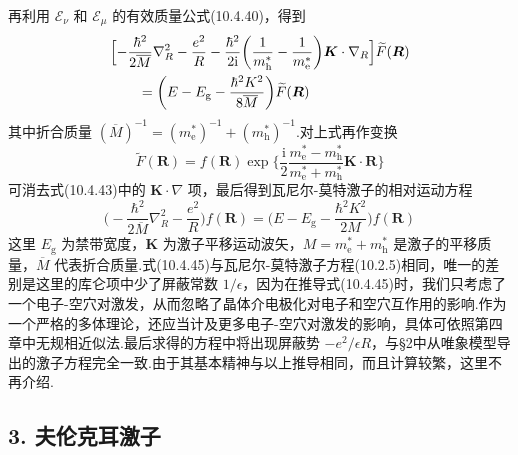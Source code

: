再利用 $\mathscr{E}_{\nu}$ 和 $\mathscr{E}_{\mu}$ 的有效质量公式(10.4.40)，得到
\begin{equation}
\begin{aligned}
  &\Bigl[-\frac{\hbar^{2}}{2\overline{M}}\nabla_{R}^{2}
  -\frac{e^{2}}{R}
  -\frac{\hbar^{2}}{2\mathrm{i}}\biggl(\frac{1}{m_{\mathrm{h}}^{*}}
  -\frac{1}{m_{\mathrm{e}}^{*}}\biggr)\boldsymbol{K}\cdot\nabla_{R}\Bigr]\widetilde{F}(\boldsymbol{R})\\
  &\qquad=\biggl(E-E_{\mathrm{g}}-\frac{\hbar^{2}K^{2}}{8\overline{M}}\biggr)\widetilde{F}(\boldsymbol{R})
\end{aligned}
\end{equation}
其中折合质量 $\left(\overline{M}\right)^{-1}
=\left(m_{\mathrm{e}}^{*}\right)^{-1}
+\left(m_{\mathrm{h}}^{*}\right)^{-1}$.对上式再作变换
\begin{equation}
  \widetilde{F}(\boldsymbol{R})=f(\boldsymbol{R})\exp
  \biggl\{\frac{\mathrm{i}}{2}\frac{m_{\mathrm{e}}^{*}-m_{\mathrm{h}}^{*}}
  {m_{\mathrm{e}}^{*}+m_{\mathrm{h}}^{*}}\boldsymbol{K}\cdot\boldsymbol{R}\biggr\}
\end{equation}
可消去式(10.4.43)中的 $\boldsymbol{K}\cdot\nabla$ 项，最后得到瓦尼尔-莫特激子的相对运动方程
\begin{equation}
  \Biggl(-\frac{\hbar^{2}}{2\overline{M}}\nabla_{R}^{2}
  -\frac{e^{2}}{R}\Biggr)f(\boldsymbol{R})
  =\Biggl(E-E_{\mathrm{g}}-\frac{\hbar^{2}K^{2}}{2M}\Biggr)f(\boldsymbol{R})
\end{equation}
这里 $E_{\mathrm{g}}$ 为禁带宽度，$\boldsymbol{K}$ 为激子平移运动波矢，$M=m_{\mathrm{e}}^{*}+m_{\mathrm{h}}^{*}$ 是激子的平移质量，$\overline{M}$ 代表折合质量.式(10.4.45)与瓦尼尔-莫特激子方程(10.2.5)相同，唯一的差别是这里的库仑项中少了屏蔽常数 $1/\epsilon$，因为在推导式(10.4.45)时，我们只考虑了一个电子-空穴对激发，从而忽略了晶体介电极化对电子和空穴互作用的影响.作为一个严格的多体理论，还应当计及更多电子-空穴对激发的影响，具体可依照第四章中无规相近似法.最后求得的方程中将出现屏蔽势 $-e^{2}/\epsilon R$，与§2中从唯象模型导出的激子方程完全一致.由于其基本精神与以上推导相同，而且计算较繁，这里不再介绍.

\subsection*{3. 夫伦克耳激子}


